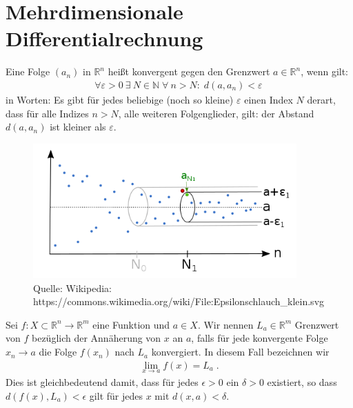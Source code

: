 \section{Mehrdimensionale Differentialrechnung}

\begin{Definition}[Konvergenz]
 Eine Folge $(a_n)$ in $\mathbb{R}^n$ heißt konvergent gegen den Grenzwert $a \in \mathbb{R}^n$, wenn gilt:
\begin{align*}
\forall {\varepsilon > 0} \ \exists \ N \in \mathbb{N} \; \forall \ n > N: \; d(a, a_n) < \varepsilon\,
\end{align*}
in Worten: Es gibt für jedes beliebige (noch so kleine) $\varepsilon$ einen Index $N$ derart, dass für alle Indizes $n > N$, alle weiteren Folgenglieder, gilt: der Abstand $d(a, a_n)$ ist kleiner als $\varepsilon$.
\end{Definition}

\begin{figure}[H]
      \centering
    \includegraphics[width=0.9\textwidth]{images/500px-Epsilonschlauch_klein}
      \caption{Quelle: Wikipedia: https://commons.wikimedia.org/wiki/File:Epsilonschlauch\_klein.svg}
\end{figure}



\begin{Definition}[Grenzwert]
Sei $f :X \subset \mathbb{R}^n \to \mathbb{R}^m$ eine  Funktion und $a \in X$. Wir nennen $L_a \in \mathbb{R}^m$ Grenzwert von $f$ bezüglich der Annäherung von $x$ an $a$, falls für jede  konvergente Folge $x_n \to a$  die Folge $f(x_n)$ nach $L_a$ konvergiert.  In diesem Fall bezeichnen wir
\begin{align*}
\lim_{x \to a} f(x) = L_a \;.
\end{align*}
Dies ist gleichbedeutend damit, dass für jedes $\epsilon > 0$ ein $\delta > 0$ existiert, so dass
$d(f(x) ,L_a) < \epsilon$ gilt für jedes $x$ mit $d(x, a) < \delta$.
\end{Definition}


